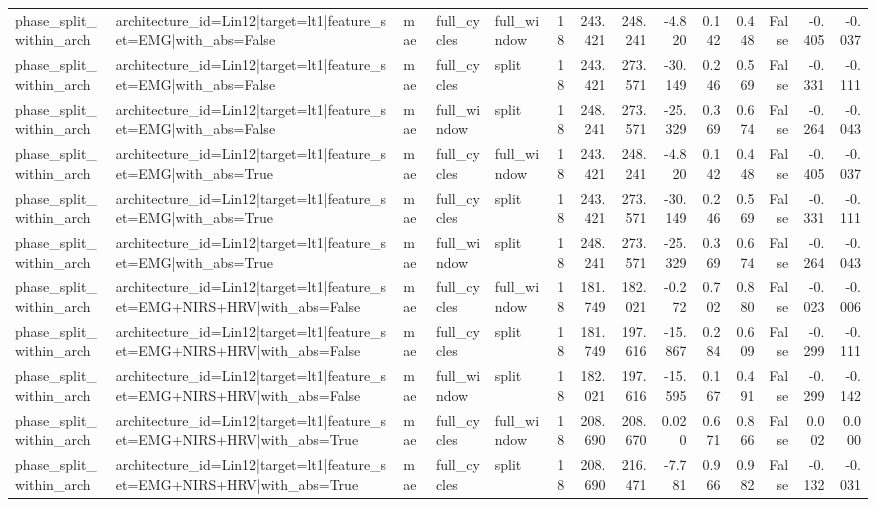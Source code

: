 \begin{table}
\begin{tabular}{lllllrrrrrrrrr}
phase_split_within_arch & architecture_id=Lin12|target=lt1|feature_set=EMG|with_abs=False & mae & full_cycles & full_window & 18 & 243.421 & 248.241 & -4.820 & 0.142 & 0.448 & False & -0.405 & -0.037 \\
phase_split_within_arch & architecture_id=Lin12|target=lt1|feature_set=EMG|with_abs=False & mae & full_cycles & split & 18 & 243.421 & 273.571 & -30.149 & 0.246 & 0.569 & False & -0.331 & -0.111 \\
phase_split_within_arch & architecture_id=Lin12|target=lt1|feature_set=EMG|with_abs=False & mae & full_window & split & 18 & 248.241 & 273.571 & -25.329 & 0.369 & 0.674 & False & -0.264 & -0.043 \\
phase_split_within_arch & architecture_id=Lin12|target=lt1|feature_set=EMG|with_abs=True & mae & full_cycles & full_window & 18 & 243.421 & 248.241 & -4.820 & 0.142 & 0.448 & False & -0.405 & -0.037 \\
phase_split_within_arch & architecture_id=Lin12|target=lt1|feature_set=EMG|with_abs=True & mae & full_cycles & split & 18 & 243.421 & 273.571 & -30.149 & 0.246 & 0.569 & False & -0.331 & -0.111 \\
phase_split_within_arch & architecture_id=Lin12|target=lt1|feature_set=EMG|with_abs=True & mae & full_window & split & 18 & 248.241 & 273.571 & -25.329 & 0.369 & 0.674 & False & -0.264 & -0.043 \\
phase_split_within_arch & architecture_id=Lin12|target=lt1|feature_set=EMG+NIRS+HRV|with_abs=False & mae & full_cycles & full_window & 18 & 181.749 & 182.021 & -0.272 & 0.702 & 0.880 & False & -0.023 & -0.006 \\
phase_split_within_arch & architecture_id=Lin12|target=lt1|feature_set=EMG+NIRS+HRV|with_abs=False & mae & full_cycles & split & 18 & 181.749 & 197.616 & -15.867 & 0.284 & 0.609 & False & -0.299 & -0.111 \\
phase_split_within_arch & architecture_id=Lin12|target=lt1|feature_set=EMG+NIRS+HRV|with_abs=False & mae & full_window & split & 18 & 182.021 & 197.616 & -15.595 & 0.167 & 0.491 & False & -0.299 & -0.142 \\
phase_split_within_arch & architecture_id=Lin12|target=lt1|feature_set=EMG+NIRS+HRV|with_abs=True & mae & full_cycles & full_window & 18 & 208.690 & 208.670 & 0.020 & 0.671 & 0.866 & False & 0.002 & 0.000 \\
phase_split_within_arch & architecture_id=Lin12|target=lt1|feature_set=EMG+NIRS+HRV|with_abs=True & mae & full_cycles & split & 18 & 208.690 & 216.471 & -7.781 & 0.966 & 0.982 & False & -0.132 & -0.031 \\

\end{tabular}
\end{table}
